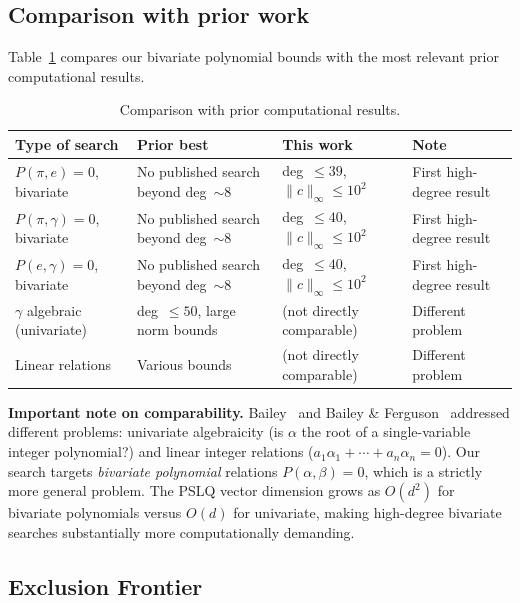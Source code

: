 \documentclass[11pt]{amsart}
\theoremstyle{remark}
\newcommand{\norm}[1]{\lVert #1 \rVert}
\begin{document}
\subsection{Comparison with prior work}\label{ssec:comparison}

Table~\ref{tab:comparison} compares our bivariate polynomial bounds with the most
relevant prior computational results.

\begin{table}[ht]
\centering
\caption{Comparison with prior computational results.}\label{tab:comparison}
\begin{tabular}{@{}p{3.2cm}p{4cm}p{3.5cm}p{2.8cm}@{}}
\toprule
Type of search & Prior best & This work & Note \\
\midrule
$P(\pi,e)=0$, bivariate
  & No published search beyond deg~${\sim}8$
  & deg~$\le 39$, $\norm{c}_\infty\!\le\!10^2$
  & First high-degree result \\
$P(\pi,\gamma)=0$, bivariate
  & No published search beyond deg~${\sim}8$
  & deg~$\le 40$, $\norm{c}_\infty\!\le\!10^2$
  & First high-degree result \\
$P(e,\gamma)=0$, bivariate
  & No published search beyond deg~${\sim}8$
  & deg~$\le 40$, $\norm{c}_\infty\!\le\!10^2$
  & First high-degree result \\
$\gamma$ algebraic (univariate)
  & deg~$\le 50$, large norm bounds~\cite{Bailey1988,BaileyFerguson1989}
  & (not directly comparable)
  & Different problem \\
Linear relations
  & Various bounds~\cite{BaileyFerguson1989}
  & (not directly comparable)
  & Different problem \\
\bottomrule
\end{tabular}
\end{table}

\noindent\textbf{Important note on comparability.}
Bailey~\cite{Bailey1988} and Bailey \& Ferguson~\cite{BaileyFerguson1989} addressed
different problems: univariate algebraicity (is $\alpha$ the root of a
single-variable integer polynomial?) and linear integer relations
($a_1\alpha_1+\cdots+a_n\alpha_n=0$). Our search targets \emph{bivariate polynomial}
relations $P(\alpha,\beta)=0$, which is a strictly more general problem. The PSLQ
vector dimension grows as $O(d^2)$ for bivariate polynomials versus $O(d)$ for
univariate, making high-degree bivariate searches substantially more computationally
demanding.

\subsection{Exclusion Frontier}\label{ssec:frontier}
\end{document}
